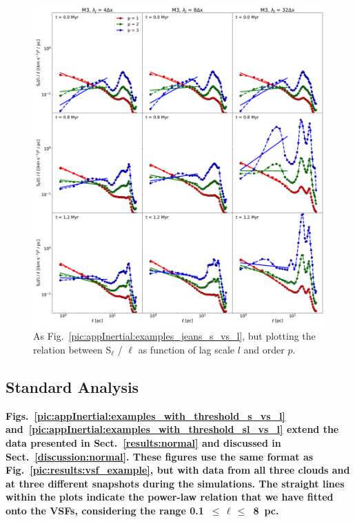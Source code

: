  	
\begin{figure}
    \centering
    \includegraphics[width=\textwidth]{app_examples_jeans_sl_l.pdf}
    \caption{
        As Fig.~\ref{pic:appInertial:examples_jeans_s_vs_l}, but plotting the relation between S$_{\ell}$ / $\ell$ as function of lag scale $l$ and order $p$.
    }
    \label{pic:appInertial:examples_jeans_sl_vs_l}
\end{figure}

\subsection{Standard Analysis}\label{Bsub:standard}

\textbf{Figs.~\ref{pic:appInertial:examples_with_threshold_s_vs_l} and~\ref{pic:appInertial:examples_with_threshold_sl_vs_l} extend the data presented in Sect.~\ref{results:normal} and discussed in Sect.~\ref{discussion:normal}.
These figures use the same format as Fig.~\ref{pic:results:vsf_example}, but with data from all three clouds and at three different snapshots during the simulations.
The straight lines within the plots indicate the power-law relation that we have fitted onto the VSFs, considering the range 0.1~$\leq\,\ell\,\leq$~8~pc.
}

